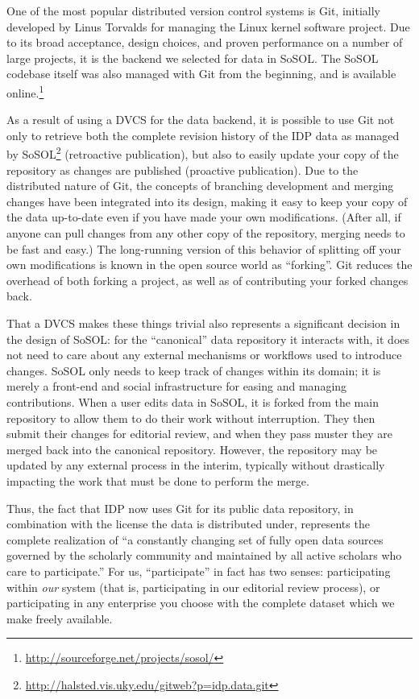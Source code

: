 \documentclass[]{article}
\begin{document}
One of the most popular distributed version control systems is Git, initially developed by Linus Torvalds for managing the Linux kernel software project. Due to its broad acceptance, design choices, and proven performance on a number of large projects, it is the backend we selected for data in SoSOL. The SoSOL codebase itself was also managed with Git from the beginning, and is available online.\footnote{\url{http://sourceforge.net/projects/sosol/}}

As a result of using a DVCS for the data backend, it is possible to use Git not only to retrieve both the complete revision history of the IDP data as managed by SoSOL\footnote{\url{http://halsted.vis.uky.edu/gitweb?p=idp.data.git}} (retroactive publication), but also to easily update your copy of the repository as changes are published (proactive publication). Due to the distributed nature of Git, the concepts of branching development and merging changes have been integrated into its design, making it easy to keep your copy of the data up-to-date even if you have made your own modifications. (After all, if anyone can pull changes from any other copy of the repository, merging needs to be fast and easy.) The long-running version of this behavior of splitting off your own modifications is known in the open source world as “forking”. Git reduces the overhead of both forking a project, as well as of contributing your forked changes back.

That a DVCS makes these things trivial also represents a significant decision in the design of SoSOL: for the “canonical” data repository it interacts with, it does not need to care about any external mechanisms or workflows used to introduce changes. SoSOL only needs to keep track of changes within its domain; it is merely a front-end and social infrastructure for easing and managing contributions. When a user edits data in SoSOL, it is forked from the main repository to allow them to do their work without interruption. They then submit their changes for editorial review, and when they pass muster they are merged back into the canonical repository. However, the repository may be updated by any external process in the interim, typically without drastically impacting the work that must be done to perform the merge.

Thus, the fact that IDP now uses Git for its public data repository, in combination with the license the data is distributed under, represents the complete realization of “a constantly changing set of fully open data sources governed by the scholarly community and maintained by all active scholars who care to participate.” For us, “participate” in fact has two senses: participating within \emph{our} system (that is, participating in our editorial review process), or participating in any enterprise you choose with the complete dataset which we make freely available.
\end{document}

